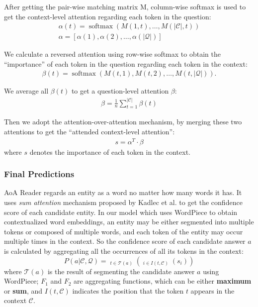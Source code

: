\documentclass[sigconf, screen]{acmart}
\newcommand{\aoa}{AoA Reader\xspace}
\DeclareMathOperator{\softmax}{softmax}
\DeclareMathOperator*{\fa}{F_1}
\DeclareMathOperator*{\fb}{F_2}
\begin{document}
After getting the pair-wise matching matrix M, column-wise softmax is used to get the context-level attention regarding each token in the question:
\begin{gather}
    \alpha(t) = \softmax(M(1, t), \dots, M(|\mathcal{C}|, t)) \\
    \alpha = [\alpha(1), \alpha(2), \dots, \alpha(|\mathcal{Q}|)]
\end{gather}

We calculate a reversed attention using row-wise softmax to obtain the ``importance'' of each token in the question regarding each token in the context:
\begin{gather}
    \beta(t) = \softmax(M(t, 1), M(t, 2), \dots, M(t, |\mathcal{Q}|)).
\end{gather}

We average all $\beta(t)$ to get a question-level attention $\beta$:
\begin{gather}
    \beta = \frac{1}{n}\sum_{t=1}^{|\mathcal{C}|}\beta(t)
\end{gather}

Then we adopt the attention-over-attention mechanism, by merging these two attentions to get the ``attended context-level attention'':
\begin{gather}
    s = \alpha^T \cdot \beta
\end{gather}
where $s$ denotes the importance of each token in the context.

\subsubsection{Final Predictions}
\aoa regards an entity as a word no matter how many words it has. It uses \emph{sum attention} mechanism proposed by Kadlec et al. \cite{kadlecTextUnderstandingAttention2016} to get the confidence score of each candidate entity. In our model which uses WordPiece to obtain contextualized word embeddings, an entity may be either segmented into multiple tokens or composed of multiple words, and each token of the entity may occur multiple times in the context. So the confidence score of each candidate answer $a$ is calculated by aggregating all the occurrences of all its tokens in the context:
\begin{equation}
    P(a|\mathcal{C}, \mathcal{Q}) = \fa_{t \in \mathcal{T}(a)}(\fb_{i \in I(t, \mathcal{C})}(s_i))
\end{equation}
where $\mathcal{T}(a)$ is the result of segmenting the candidate answer $a$ using WordPiece; $F_1$ and $F_2$ are aggregating functions, which can be either \textbf{maximum} or \textbf{sum}, and $I(t, \mathcal{C})$ indicates the position that the token $t$ appears in the context $\mathcal{C}$.
\end{document}
